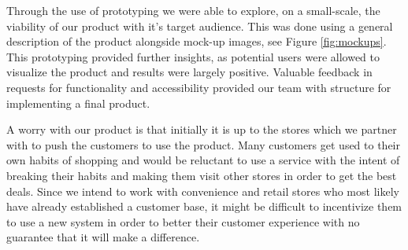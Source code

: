 \documentclass[titlepage]{article}
\begin{document}
Through the use of prototyping we were able to explore, on a small-scale, the viability of our product with it's target audience. This was done using a general description of the product alongside mock-up images, see Figure \ref{fig:mockups}.
This prototyping provided further insights, as potential users were allowed to visualize the product and results were largely positive. Valuable feedback in requests for functionality and accessibility provided our team with structure for implementing a final product.

A worry with our product is that initially it is up to the stores which we partner with to push the customers to use the product. Many customers get used to their own habits of shopping and would be reluctant to use a service with the intent of breaking their habits and making them visit other stores in order to get the best deals. Since we intend to work with convenience and retail stores who most likely have already established a customer base, it might be difficult to incentivize them to use a new system in order to better their customer experience with no guarantee that it will make a difference.
\end{document}
